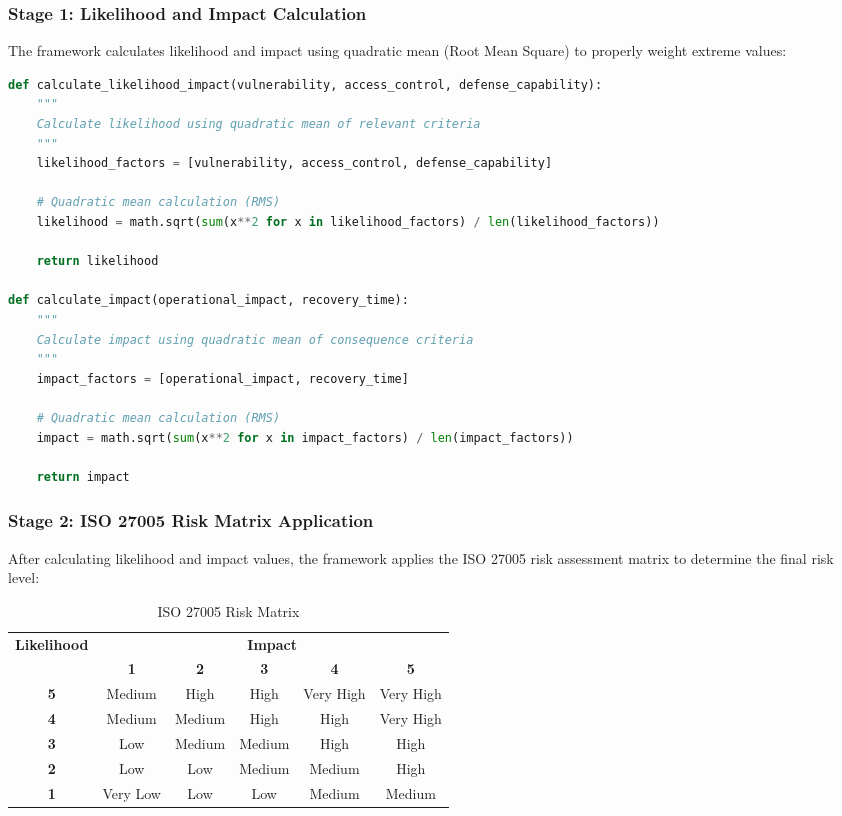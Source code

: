 \documentclass[binding=0.6cm]{sapthesis}
\begin{document}
\subsubsection{Stage 1: Likelihood and Impact Calculation}

The framework calculates likelihood and impact using quadratic mean (Root Mean Square) to properly weight extreme values:

\begin{lstlisting}[language=Python, caption=Likelihood and Impact Calculation]
def calculate_likelihood_impact(vulnerability, access_control, defense_capability):
    """
    Calculate likelihood using quadratic mean of relevant criteria
    """
    likelihood_factors = [vulnerability, access_control, defense_capability]
    
    # Quadratic mean calculation (RMS)
    likelihood = math.sqrt(sum(x**2 for x in likelihood_factors) / len(likelihood_factors))
    
    return likelihood

def calculate_impact(operational_impact, recovery_time):
    """
    Calculate impact using quadratic mean of consequence criteria
    """
    impact_factors = [operational_impact, recovery_time]
    
    # Quadratic mean calculation (RMS)
    impact = math.sqrt(sum(x**2 for x in impact_factors) / len(impact_factors))
    
    return impact
\end{lstlisting}

\subsubsection{Stage 2: ISO 27005 Risk Matrix Application}

After calculating likelihood and impact values, the framework applies the ISO 27005 risk assessment matrix to determine the final risk level:

\begin{table}[H]
\centering
\caption{ISO 27005 Risk Matrix}
\begin{tabular}{|c|c|c|c|c|c|}
\hline
\multirow{2}{*}{\textbf{Likelihood}} & \multicolumn{5}{c|}{\textbf{Impact}} \\ \cline{2-6}
& \textbf{1} & \textbf{2} & \textbf{3} & \textbf{4} & \textbf{5} \\ \hline
\textbf{5} & Medium & High & High & Very High & Very High \\ \hline
\textbf{4} & Medium & Medium & High & High & Very High \\ \hline
\textbf{3} & Low & Medium & Medium & High & High \\ \hline
\textbf{2} & Low & Low & Medium & Medium & High \\ \hline
\textbf{1} & Very Low & Low & Low & Medium & Medium \\ \hline
\end{tabular}
\end{table}
\end{document}
